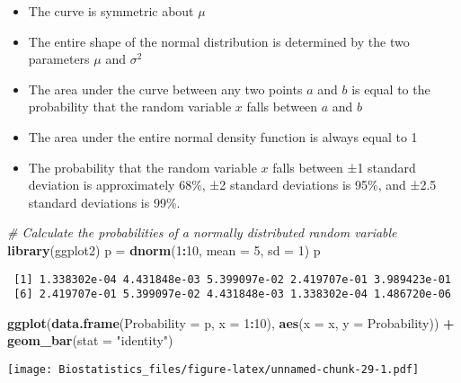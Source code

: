 \documentclass[]{book}
\newenvironment{Shaded}{\begin{snugshade}}{\end{snugshade}}
\newcommand{\KeywordTok}[1]{\textcolor[rgb]{0.13,0.29,0.53}{\textbf{#1}}}
\newcommand{\DataTypeTok}[1]{\textcolor[rgb]{0.13,0.29,0.53}{#1}}
\newcommand{\DecValTok}[1]{\textcolor[rgb]{0.00,0.00,0.81}{#1}}
\newcommand{\StringTok}[1]{\textcolor[rgb]{0.31,0.60,0.02}{#1}}
\newcommand{\CommentTok}[1]{\textcolor[rgb]{0.56,0.35,0.01}{\textit{#1}}}
\newcommand{\OperatorTok}[1]{\textcolor[rgb]{0.81,0.36,0.00}{\textbf{#1}}}
\newcommand{\NormalTok}[1]{#1}
\providecommand{\tightlist}{%
  \setlength{\itemsep}{0pt}\setlength{\parskip}{0pt}}
\theoremstyle{definition}
\theoremstyle{definition}
\theoremstyle{definition}
\theoremstyle{remark}
\begin{document}
\begin{itemize}
\tightlist
\item
  The curve is symmetric about \({\mu}\)
\item
  The entire shape of the normal distribution is determined by the two
  parameters \({\mu}\) and \({\sigma^{2}}\)
\item
  The area under the curve between any two points \({a}\) and \({b}\) is
  equal to the probability that the random variable \({x}\) falls
  between \({a}\) and \({b}\)
\item
  The area under the entire normal density function is always equal to 1
\item
  The probability that the random variable \({x}\) falls between ±1
  standard deviation is approximately 68\%, ±2 standard deviations is
  95\%, and ±2.5 standard deviations is 99\%.
\end{itemize}

\begin{Shaded}
\begin{Highlighting}[]
\CommentTok{# Calculate the probabilities of a normally distributed random variable}
\KeywordTok{library}\NormalTok{(ggplot2)}
\NormalTok{p =}\StringTok{ }\KeywordTok{dnorm}\NormalTok{(}\DecValTok{1}\OperatorTok{:}\DecValTok{10}\NormalTok{, }\DataTypeTok{mean =} \DecValTok{5}\NormalTok{, }\DataTypeTok{sd =} \DecValTok{1}\NormalTok{)}
\NormalTok{p}
\end{Highlighting}
\end{Shaded}

\begin{verbatim}
 [1] 1.338302e-04 4.431848e-03 5.399097e-02 2.419707e-01 3.989423e-01
 [6] 2.419707e-01 5.399097e-02 4.431848e-03 1.338302e-04 1.486720e-06
\end{verbatim}

\begin{Shaded}
\begin{Highlighting}[]
\KeywordTok{ggplot}\NormalTok{(}\KeywordTok{data.frame}\NormalTok{(}\DataTypeTok{Probability =}\NormalTok{ p, }\DataTypeTok{x =} \DecValTok{1}\OperatorTok{:}\DecValTok{10}\NormalTok{), }\KeywordTok{aes}\NormalTok{(}\DataTypeTok{x =}\NormalTok{ x, }\DataTypeTok{y =}\NormalTok{ Probability)) }\OperatorTok{+}
\StringTok{  }\KeywordTok{geom_bar}\NormalTok{(}\DataTypeTok{stat =} \StringTok{"identity"}\NormalTok{)}
\end{Highlighting}
\end{Shaded}

\texttt{[image: Biostatistics\_files/figure-latex/unnamed-chunk-29-1.pdf]}
\end{document}
